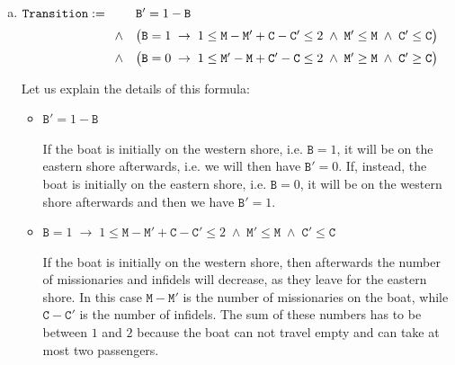 \begin{enumerate}[(a)]
\begin{itemize}
            If neither $\mathtt{M} = 3$ nor $\mathtt{M} = 0$ holds, then the number of missionaries and
            cannibals have to be the same on the western shore, because if, for example, there were more
            missionaries on the western shore than cannibals, then there would be less missionaries than
            cannibals on the eastern shore and hence there would be a problem.
      \end{itemize}
      The condition $\mathtt{B} \leq 1$ is needed because there is just one boat, but the set $\mathcal{U}$ of
      values also includes the numbers $2$ and $3$.
\item $\texttt{Transition} :=
      \begin{array}[t]{cl}
         &  \mathtt{B}' = 1 - \mathtt{B}   \\[0.2cm]
        \wedge & \bigl(\mathtt{B} = 1 \;\rightarrow\; 1 \leq \mathtt{M} - \mathtt{M}'  + \mathtt{C} - \mathtt{C}' \leq 2 \;\wedge\;
        \mathtt{M}' \leq \mathtt{M} \;\wedge\; \mathtt{C}' \leq \mathtt{C}\bigr) \\[0.2cm]
        \wedge & \bigl(\mathtt{B} = 0 \;\rightarrow\; 1 \leq \mathtt{M}' - \mathtt{M}  + \mathtt{C}' - \mathtt{C} \leq 2 \;\wedge\;
                \mathtt{M}' \geq \mathtt{M} \;\wedge\; \mathtt{C}' \geq \mathtt{C}\bigr) 
      \end{array}
      $

      Let us explain the details of this formula:
      \begin{itemize}
      \item $\mathtt{B}' = 1 - \mathtt{B}$

            If the boat is initially on the western shore, i.e. $\texttt{B} = 1$, it will be on the eastern
            shore afterwards, i.e. we will then have $\texttt{B}' = 0$.  If, instead, the boat is initially on
            the eastern shore, i.e. $\texttt{B} = 0$, it will be on the western
            shore afterwards and then we have $\texttt{B}' = 1$.
      \item $\mathtt{B} = 1 \;\rightarrow\; 1 \leq \mathtt{M} - \mathtt{M}'  + \mathtt{C} - \mathtt{C}' \leq 2 \;\wedge\;
             \mathtt{M}' \leq \mathtt{M} \;\wedge\; \mathtt{C}' \leq \mathtt{C}$


            If the boat is initially on the western shore, then afterwards the number of missionaries and
            infidels will decrease, as they leave for the eastern shore.  In this case $\texttt{M} - \texttt{M}'$
            is the number of missionaries on the boat, while $\texttt{C} - \texttt{C}'$ is the number of
            infidels.  The sum of these numbers has to be between $1$ and $2$ because the boat can not travel
            empty and can take at most two passengers.


\end{itemize}
\end{enumerate}

